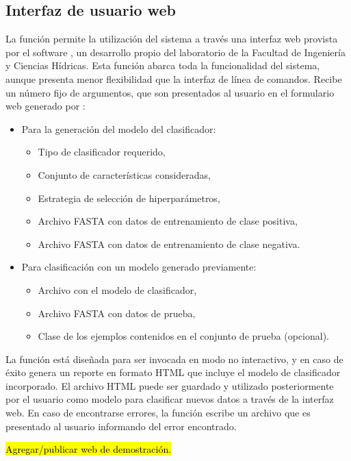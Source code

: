 %
%
\subsection{Interfaz de usuario web}
%
La función  permite la utilización del sistema a través
una interfaz web provista por el software \eng{\webdemo{}}
\cite{webdemobuilder}, un desarrollo propio del laboratorio
 de la Facultad de Ingeniería y Ciencias Hídricas.
Esta función abarca toda la funcionalidad del sistema, aunque presenta
menor flexibilidad que la interfaz de línea de comandos.
Recibe un número fijo de argumentos, que son presentados al usuario en
el formulario web generado por \eng{\webdemo{}}:
%
\begin{itemize}
\item
  Para la generación del modelo del clasificador:
  \begin{itemize}
  \item
    Tipo de clasificador requerido,
  \item
    Conjunto de características consideradas,
  \item
    Estrategia de selección de hiperparámetros,
  \item
    Archivo FASTA con datos de entrenamiento de clase positiva,
  \item
    Archivo FASTA con datos de entrenamiento de clase negativa.
  \end{itemize}
\item
  Para clasificación con un modelo generado previamente:
  \begin{itemize}
  \item
    Archivo con el modelo de clasificador,
  \item
    Archivo FASTA con datos de prueba,
  \item
    Clase de los ejemplos contenidos en el conjunto de prueba (opcional).
  \end{itemize}
\end{itemize}
%
La función está diseñada para ser invocada en modo no interactivo, y
en caso de éxito genera un reporte en formato HTML que incluye el
modelo de clasificador incorporado.
El archivo HTML puede ser guardado y utilizado posteriormente por el
usuario como modelo para clasificar nuevos datos a través de la
interfaz web.
En caso de encontrarse errores, la función  escribe un
archivo  que es presentado al usuario informando del error
encontrado.

\hl{Agregar/publicar web de demostración.}
